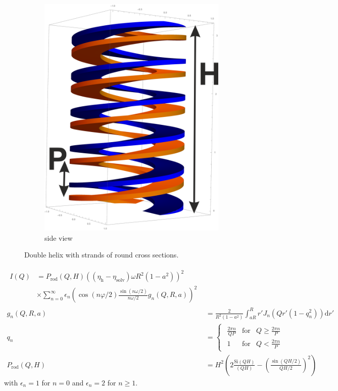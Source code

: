 \begin{figure}[htb]
\begin{subfigure}[b]{.48\textwidth}
   \includegraphics[width=1\textwidth]{../images/form_factor/cylindrical_obj/fanlike_helices3D.png}
   \caption{side view}
   \label{fig:fanhelixside2}
\end{subfigure}
\caption{Double helix with strands of round cross sections.} \label{fig:fanhelix}
\end{figure}

\begin{align}
\begin{split}
I(Q) &= P_\text{rod}(Q,H) \left(\left(\eta_\text{h}-\eta_\text{solv}\right)\omega R^2\left(1-a^2\right)\right)^2 \\
&\times \sum_{n=0}^\infty \epsilon_n \left( \cos(n\varphi/2) \frac{\sin(n\omega/2)}{n\omega/2} g_n\left(Q,R,a\right)\right)^2
\end{split} \\
g_n\left(Q,R,a\right) &= \frac{2}{R^2\left(1-a^2\right)} \int_{aR}^R r' J_n\left(Qr'\left(1-q_n^2\right)\right)\mathrm{d}r' \\
q_n &=
\begin{cases}
\begin{array}{rcl}
\frac{2\pi n}{QP} & \text{for} & Q\geq \frac{2\pi n}{P}\\
1 & \text{for} & Q < \frac{2\pi n}{P}
\end{array}
\end{cases} \\
P_\text{rod}(Q,H) &= H^2 \left(2\frac{\mathrm{Si}(QH)}{(QH)}-\left(\frac{\sin(QH/2)}{QH/2}\right)^2\right)
\end{align}
with $\epsilon_n=1$ for $n=0$ and $\epsilon_n=2$ for $n\geq 1$.

